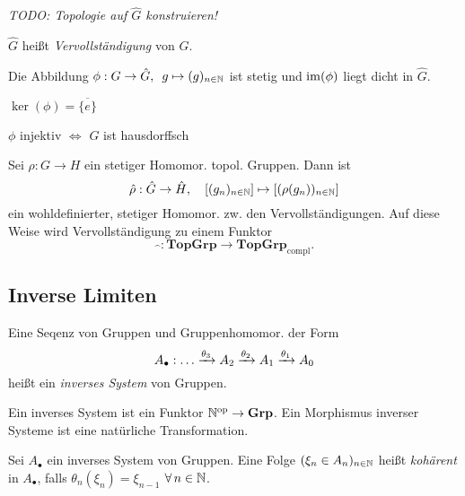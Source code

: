 \documentclass{cheat-sheet}
\newcommand{\clos}[1]{\overline{#1}} %
\newcommand{\Grp}{\mathbf{Grp}} %
\newcommand{\TopGrp}{\mathbf{TopGrp}} %
\newcommand{\ComplTopGrp}{\mathbf{TopGrp}_{\text{compl}}} %
\newcommand{\op}{\mathrm{op}} %
\begin{document}
\emph{TODO: Topologie auf $\hat{G}$ konstruieren!}

\begin{defn}
  $\hat{G}$ heißt \emph{Vervollständigung} von $G$.
\end{defn}

\begin{bem}
  Die Abbildung $\phi : G \to \hat{G}, \enspace g \mapsto (g)_{n \in \mathbb{N}}$ ist stetig und $\operatorname{im}(\phi)$ liegt dicht in $\hat{G}$.
\end{bem}

\begin{lem}
  $\ker(\phi) = \clos{\{ e \}}$
\end{lem}

\begin{kor}
  $\phi$ injektiv $\iff$ $G$ ist hausdorffsch
\end{kor}

\begin{bem}
  Sei $\rho \!:\! G \to H$ ein stetiger Homomor. topol. Gruppen.
  Dann ist
  \[
    \hat{\rho} : \hat{G} \to \hat{H}, \quad
    [(g_n)_{n \in \mathbb{N}}] \mapsto [(\rho(g_n))_{n \in \mathbb{N}}]
  \]
  ein wohldefinierter, stetiger Homomor. zw. den Vervollständigungen.
  Auf diese Weise wird Vervollständigung zu einem Funktor
  \[
    \widehat{\enspace} : \TopGrp \to \ComplTopGrp.
  \]
\end{bem}

\subsection{Inverse Limiten}

\begin{defn}
  Eine Seqenz von Gruppen und Gruppenhomomor. der Form
  \[
    A_\bullet : \ldots \xrightarrow{\theta_3} A_2 \xrightarrow{\theta_2} A_1 \xrightarrow{\theta_1} A_0
  \]
  heißt ein \emph{inverses System} von Gruppen.
\end{defn}

\begin{bem}
  Ein inverses System ist ein Funktor $\N^\op \to \Grp$.
  Ein Morphismus inverser Systeme ist eine natürliche Transformation.
\end{bem}

\begin{defn}
  Sei $A_\bullet$ ein inverses System von Gruppen.
  Eine Folge $(\xi_n \in A_n)_{n \in \mathbb{N}}$ heißt \emph{kohärent} in $A_\bullet$, falls $\theta_n(\xi_n) = \xi_{n-1}$ $\forall \, n \in \mathbb{N}$.
\end{defn}
\end{document}
